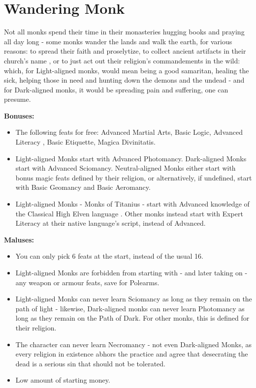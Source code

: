 \section{Wandering Monk}
Not all monks spend their time in their monasteries hugging books and praying all day long - some monks wander the lands and walk the earth, for various reasons: to spread their faith and proselytize, to collect ancient artifacts in their church's name , or to just act out their religion's commandements in the wild: which, for Light-aligned monks, would mean being a good samaritan, healing the sick, helping those in need and hunting down the demons and the undead - and for Dark-aligned monks, it would be spreading pain and suffering, one can presume. 


\textbf{Bonuses:}
\begin{itemize}
	\item The following feats for free: Advanced Martial Arts, Basic Logic, Advanced Literacy , Basic Etiquette, Magica Divinitatis.
	\item Light-aligned Monks start with Advanced Photomancy. Dark-aligned Monks start with Advanced Sciomancy. Neutral-aligned Monks either start with bonus magic feats defined by their religion, or alternatively, if undefined, start with Basic Geomancy and Basic Aeromancy.
	\item Light-aligned Monks - Monks of Titanius - start with Advanced knowledge of the Classical High Elven language . Other monks instead start with Expert Literacy at their native language's script, instead of Advanced.
\end{itemize}


\textbf{Maluses:}
\begin{itemize}
	\item You can only pick 6 feats at the start, instead of the usual 16.
	\item Light-aligned Monks are forbidden from starting with - and later taking on - any weapon or armour feats, save for Polearms.
	\item Light-aligned Monks can never learn Sciomancy as long as they remain on the path of light - likewise, Dark-aligned monks can never learn Photomancy as long as they remain on the Path of Dark. For other monks, this is defined for their religion.
	\item The character can never learn Necromancy - not even Dark-aligned Monks, as every religion in existence  abhors the practice and agree that desecrating the dead is a serious sin that should not be tolerated.
	\item Low amount of starting money.
\end{itemize}

